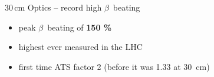 \documentclass[4pt,usenames,dvipsnames,aspectratio=169,table]{beamer}
\newcommand{\bonelabel}{%
        \node at ($(b1) +(-0.13\linewidth, 0.16\linewidth)$) {\sffamily\small\textbf{Beam 1}};
}
\newcommand{\btwolabel}{%
        \node at ($(b1) +(-0.13\linewidth, 0.16\linewidth)$) {\sffamily\small\textbf{Beam 2}};
}
\begin{document}
\begin{frame}{30\,cm Optics -- record high $\beta$~beating}

    \hfill
    
    \begin{itemize}
        \item peak $\beta$~beating of \textbf{150 \%}
        \item highest ever measured in the LHC
        \item first time ATS factor 2 (before it was 1.33 at \SI{30}{cm})
    \end{itemize}
    
\end{frame}
\end{document}
